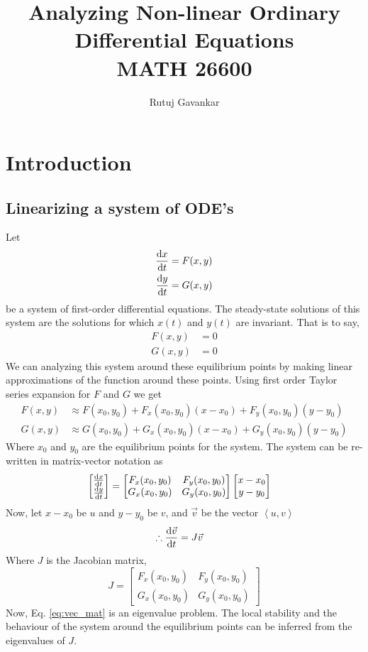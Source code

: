 \documentclass[12pt,1in]{article}
\title{Analyzing Non-linear Ordinary Differential Equations\\ {\small MATH 26600}}
\author{Rutuj Gavankar}
\date{}
\begin{document}
\maketitle

\section{Introduction}

\subsection{Linearizing a system of ODE's}


Let 
\begin{align}
\derivative{x}{t} &= F(x, y) \\
\derivative{y}{t} &= G(x , y)
\end{align}
be a system of first-order differential equations. The steady-state solutions of this system are the solutions for which  $x(t)$ and $y(t)$ are invariant. That is to say,
\begin{align}
    F(x,y) &= 0 \\
    G(x,y) &= 0
\end{align}
We can analyzing this system around these equilibrium points by making linear approximations of the function around these points. Using first order Taylor series expansion for $F$ and $G$ we get
\begin{align}
    F(x,y) &\approx F(x_0, y_0) + F_x(x_0, y_0)(x - x_0) + F_y(x_0, y_0)(y - y_0) \\
    G(x,y) &\approx G(x_0, y_0) + G_x(x_0, y_0)(x - x_0) + G_y(x_0, y_0)(y - y_0)
\end{align}
Where $x_0$ and $y_0$ are the equilibrium points for the system. The system can be re-written in matrix-vector notation as 
\begin{align}
    \begin{bmatrix}
    \derivative{x}{t} \\
    \derivative{y}{t}
    \end{bmatrix} &= 
    \begin{bmatrix}
    F_x(x_0, y_0) & F_y(x_0, y_0)\\
    G_x(x_0, y_0) & G_y(x_0, y_0)
    \end{bmatrix}
    \begin{bmatrix}
    x - x_0 \\
    y - y_0
    \end{bmatrix}
\end{align}Now, let $x - x_0$ be $u$ and $y - y_0$ be $v$, and $\Vec{v}$ be the vector $\left<u ,v\right>$
\begin{align}
    \therefore \derivative{\Vec{v}}{t} &= J\Vec{v} \label{eq:vec_mat}
\end{align}
Where $J$ is the Jacobian matrix, $$J = \begin{bmatrix}
    F_x(x_0, y_0) & F_y(x_0, y_0)\\
    G_x(x_0, y_0) & G_y(x_0, y_0)
    \end{bmatrix}$$
Now, Eq. \ref{eq:vec_mat} is an eigenvalue problem. The local stability and the behaviour of the system around the equilibrium points can be inferred from the eigenvalues of $J$. 
\end{document}
